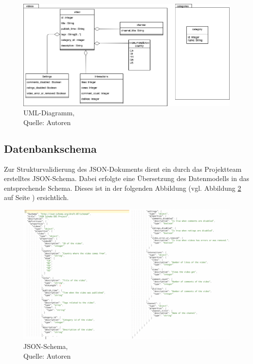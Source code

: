 \documentclass[12pt,titlepage]{article}
\begin{document}
\begin{figure}[h]
\centering
\includegraphics[width=16cm]{IMG/UMLdiagramm.png}
\caption[UML-Diagramm]{UML-Diagramm,\\ Quelle: Autoren}
\label{img: UML-Diagramm}
\end{figure}
\newpage

\subsection{Datenbankschema}\label{Datenbankschema}
Zur Strukturvalidierung des JSON-Dokuments dient ein durch das Projektteam erstelltes JSON-Schema. Dabei erfolgte eine Übersetzung des Datenmodells in das entsprechende Schema. Dieses ist in der folgenden Abbildung (vgl. Abbildung \ref{img: JSON-Schema} auf Seite \pageref{img: JSON-Schema}) ersichtlich.
\begin{figure}
\centering
\includegraphics[width=17cm]{IMG/jsonschema.png}
\caption[JSON-Schema]{JSON-Schema,\\ Quelle: Autoren}
\label{img: JSON-Schema}
\end{figure}
\clearpage
\end{document}
